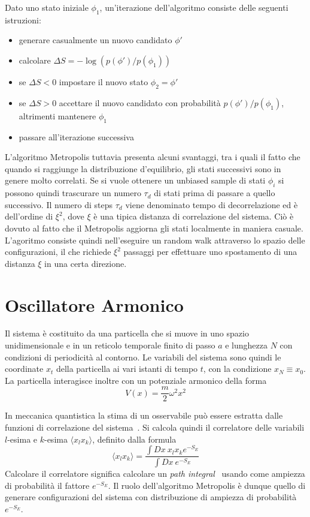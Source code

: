 Dato uno stato iniziale $\phi_1$, un'iterazione dell'algoritmo consiste delle seguenti istruzioni:
\begin{itemize}
    \item generare casualmente un nuovo candidato $\phi'$
    \item calcolare $\Delta S = -\log(p(\phi')/p(\phi_1))$
    \item se $\Delta S < 0$ impostare il nuovo stato $\phi_2=\phi'$
    \item se $\Delta S > 0$ accettare il nuovo candidato con probabilità $p(\phi')/p(\phi_1)$, altrimenti mantenere $\phi_1$
    \item passare all'iterazione successiva
\end{itemize}
L'algoritmo Metropolis tuttavia presenta alcuni svantaggi, tra i quali il fatto che quando si raggiunge la distribuzione d'equilibrio, gli stati successivi sono in genere molto correlati. Se si vuole ottenere un unbiased sample di stati $\phi_i$ si possono quindi trascurare un numero $\tau_d$ di stati prima di passare a quello successivo. Il numero di steps $\tau_d$ viene denominato tempo di decorrelazione ed è dell'ordine di $\xi^2$, dove $\xi$ è una tipica distanza di correlazione del sistema. Ciò è dovuto al fatto che il Metropolis aggiorna gli stati localmente in maniera casuale. L'agoritmo consiste quindi nell'eseguire un random walk attraverso lo spazio delle configurazioni, il che richiede $\xi^2$ passaggi per effettuare uno spostamento di una distanza $\xi$ in una certa direzione.

\section{Oscillatore Armonico}
Il sistema è costituito da una particella che si muove in uno spazio unidimensionale e in un reticolo temporale finito di passo $a$ e lunghezza $N$ con condizioni di periodicità al contorno. Le variabili del sistema sono quindi le coordinate $x_t$ della particella ai vari istanti di tempo $t$, con la condizione $x_N \equiv x_0$. La particella interagisce inoltre con un potenziale armonico della forma $$V(x) = \frac{m}{2}\omega^2 x^2$$

In meccanica quantistica la stima di un osservabile può essere estratta dalle funzioni di correlazione del sistema~\cite{otto}.
Si calcola quindi il correlatore delle variabili $l$-esima e $k$-esima $\langle x_lx_k\rangle$, definito dalla formula
$$\langle x_lx_k\rangle=\frac{\int Dx\ x_lx_ke^{-S_E}}{\int Dx\ e^{-S_E}}$$
Calcolare il correlatore significa calcolare un \textit{path integral}~\cite{sette} usando come ampiezza di probabilità il fattore $e^{-S_E}$. Il ruolo dell'algoritmo Metropolis è dunque quello di generare configurazioni del sistema con distribuzione di ampiezza di probabilità $e^{-S_E}$.
\\

